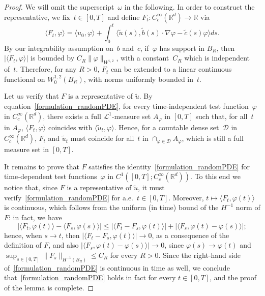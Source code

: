 \documentclass[a4paper,10pt]{article}
\newcommand\1{\mathbbm{1}}
\newcommand{\mc}{\mathcal}
\newcommand{\lan}{\langle}
\newcommand{\ran}{\rangle}
\newcommand{\td}{\tilde}
\numberwithin{equation}{section}
\begin{document}
\begin{proof}
We will omit the superscript~$\omega$ in the following. In order to construct the representative, we fix~$t \in [0,T]$ and define $F_t \colon C^\infty_c(\mathbb{R}^d) \rightarrow\mathbb{R}$ via
\begin{equation*}
\lan F_t,\varphi\ran=\lan u_0,\varphi\ran +\int^t_0\lan \td{u}(s),\td{b}(s)\cdot\nabla\varphi-\td{c}(s)\varphi\ran ds .
\end{equation*}
By our integrability assumption on~$b$ and~$c$, if~$\varphi$ has support in $B_R$, then $|\lan F_t,\varphi\ran|$ is bounded by $C_R\|\varphi\|_{W^{1,2}}$, with a constant~$C_R$ which is independent of~$t$. Therefore, for any $R>0$, $F_t$ can be extended to a linear continuous functional on $W^{1,2}_0(B_R)$, with norms uniformly bounded in~$t$.

Let us verify that $F$ is a representative of $\td{u}$. By equation~\eqref{formulation_randomPDE}, for every time-independent test function~$\varphi$ in $C^\infty_c(\mathbb{R}^d)$, there exists a full $\mc{L}^1$-measure set $A_\varphi$ in $[0,T]$ such that, for all~$t$ in $A_\varphi$, $\lan F_t,\varphi\ran$ coincides with $\lan \td{u}_t,\varphi\ran$. Hence, for a countable dense set~$\mc{D}$ in $C^\infty_c(\mathbb{R}^d)$, $F_t$ and $\td{u}_t$ must coincide for all~$t$ in $\cap_{\varphi\in\mc{D}}A_{\varphi}$, which is still a full measure set in $[0,T]$.

It remains to prove that $F$ satisfies the identity~\eqref{formulation_randomPDE} for time-dependent test functions~$\varphi$ in $C^1([0,T];C^\infty_c(\mathbb{R}^d))$. To this end we notice that, since $F$ is a representative of $\td{u}$, it must verify~\eqref{formulation_randomPDE} for a.e.~$t \in [0,T]$. Moreover, $t \mapsto \lan F_t,\varphi(t)\ran$ is continuous, which follows from the uniform (in time) bound of the $H^{-1}$ norm of $F$: in fact, we have
\begin{equation*}
|\lan F_t,\varphi(t)\ran-\lan F_s,\varphi(s)\ran|\le |\lan F_t-F_s,\varphi(t)\ran|+|\lan F_s,\varphi(t)-\varphi(s)\ran|; 
\end{equation*}
hence, when $s\rightarrow t$, then $|\lan F_t-F_s,\varphi(t)\ran| \to 0$, as a consequence of the definition of $F$, and also $|\lan F_s,\varphi(t)-\varphi(s)\ran| \to 0$, since $\varphi(s)\rightarrow\varphi(t)$ and $\sup_{s\in[0,T]}\|F_s\|_{H^{-1}(B_R)} \leq C_R$ for every $R>0$. Since the right-hand side of~\eqref{formulation_randomPDE} is continuous in time as well, we conclude that~\eqref{formulation_randomPDE} holds in fact for every $t \in [0,T]$, and 
the proof of the lemma is complete.
\end{proof}
\end{document}
